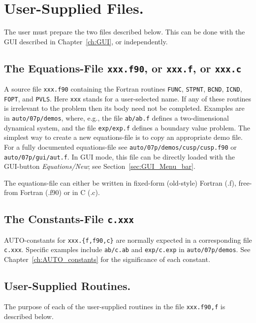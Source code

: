 \documentclass[12pt]{report}
\begin{document}
\chapter{ User-Supplied Files.} \label{ch:User_supplied_files}
The user must prepare the two files described below.
This can be done with the GUI described in Chapter~\ref{ch:GUI}, 
or independently.

\section{ The Equations-File {\tt xxx.f90}, or {\tt xxx.f}, or {\tt xxx.c}} 
A source file {\tt xxx.f90} containing the Fortran routines
{\tt FUNC}, {\tt STPNT}, {\tt BCND}, {\tt ICND}, {\tt FOPT}, and {\tt PVLS}.
Here {\tt xxx} stands for a user-selected name. 
If any of these routines is irrelevant 
to the problem then its body need not be completed.
Examples are in {\tt auto/07p/demos}, where, e.g.,
the file {\tt ab/ab.f} defines a two-dimensional dynamical system,
and the file {\tt exp/exp.f} defines a boundary value problem.
The simplest way to create a new equations-file is to copy 
an appropriate demo file.
For a fully documented equations-file see
{\tt auto/07p/demos/cusp/cusp.f90} or {\tt auto/07p/gui/aut.f}.
In GUI mode, this file can be directly loaded with the GUI-button 
{\it Equations/New}; see Section~\ref{sec:GUI_Menu_bar}.
 
The equations-file can either be written in fixed-form (old-style)
Fortran (.f), free-from Fortran (.f90) or in C (.c).

\section{ The Constants-File {\tt c.xxx}} 
{\cal AUTO}-constants for {\tt xxx.\{f,f90,c\}} are normally expected 
in a corresponding file {\tt c.xxx}.
Specific examples include {\tt ab/c.ab}
and {\tt exp/c.exp} in {\tt auto/07p/demos}.
See Chapter~\ref{ch:AUTO_constants}
for the significance of each constant.

\newpage
\section{ User-Supplied Routines.} \label{sec: User_supplied_routines}
The purpose of each of the user-supplied routines in
the file {\tt xxx.{f90,f}} is described below.
  
\end{document}
